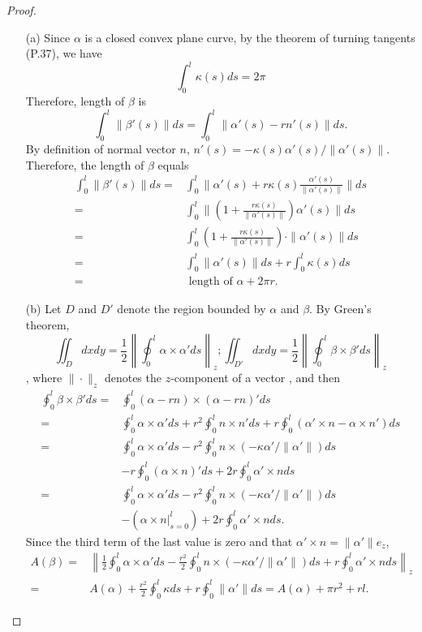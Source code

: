 \documentclass[12pt,a4paper]{article}
\begin{document}
\begin{proof}
\begin{enumerate}
\item[]
\item[(a)] Since $\alpha$ is a closed convex plane curve, by the theorem of turning tangents (P.37), we have \[ \int_0^l \kappa(s)ds = 2\pi \] Therefore, length of $\beta$ is 
\[\int_0^l \|\beta'(s)\| ds = \int_0^l \|\alpha'(s)-rn'(s)\|ds.\]
By definition of normal vector $n$, $n'(s)=-\kappa(s)\alpha'(s)/\|\alpha'(s)\|$. Therefore, the length of $\beta$ equals
\begin{align*}
\int_0^l \|\beta'(s)\| ds =& \int_0^l \|\alpha'(s)+r\kappa(s)\frac{\alpha'(s)}{\|\alpha'(s)\|}\| ds \\
 =& \int_0^l \|(1+\frac{r\kappa(s)}{\|\alpha'(s)\|})\alpha'(s)\| ds\\
 =& \int_0^l (1+\frac{r\kappa(s)}{\|\alpha'(s)\|})\cdot \|\alpha'(s)\| ds\\
 =& \int_0^l \|\alpha'(s)\| ds + r\int_0^l \kappa(s) ds\\
 =& \mbox{ length of $\alpha$} + 2\pi r.
\end{align*}
\item[(b)]
Let $D$ and $D'$ denote the region bounded by $\alpha$ and $\beta$. By Green's theorem, 
$$
\iint_D dxdy = \frac 12\left\|\oint_0^l \alpha\times\alpha' ds\right\|_z; \iint_{D'} dxdy = \frac 12\left\|\oint_0^l \beta\times\beta' ds\right\|_z
$$
, where $\|\cdot\|_z$ denotes the $z$-component of a vector , and then
\begin{align*}
\oint_0^l \beta\times\beta' ds =& \oint_0^l (\alpha - rn)\times(\alpha - rn)'ds
\\=& \oint_0^l \alpha\times\alpha' ds + r^2\oint_0^l n\times n' ds + r\oint_0^l (\alpha'\times n - \alpha\times n') ds
\\=& \oint_0^l \alpha\times\alpha' ds - r^2\oint_0^l n\times(-\kappa\alpha'/\|\alpha'\|) ds 
\\&- r\oint_0^l (\alpha\times n)'ds + 2r\oint_0^l\alpha'\times n ds
\\=& \oint_0^l \alpha\times\alpha' ds - r^2\oint_0^l n\times(-\kappa\alpha'/\|\alpha'\|) ds 
\\&- (\alpha\times n\vert_{s=0}^l) + 2r\oint_0^l\alpha'\times n ds.
\end{align*}
Since the third term of the last value is zero and that $\alpha'\times n = \|\alpha'\|e_z$, 
\begin{align*}
A(\beta) =& \left\|\frac 12\oint_0^l \alpha\times\alpha' ds - \frac{r^2}2\oint_0^l n\times(-\kappa\alpha'/\|\alpha'\|) ds + r\oint_0^l\alpha'\times n ds\right\|_z
\\=& A(\alpha) + \frac{r^2}2\oint_0^l \kappa ds + r\oint_0^l\|\alpha'\| ds = A(\alpha) + \pi r^2 + rl.
\end{align*}

\end{enumerate}

\end{proof}
\end{document}
